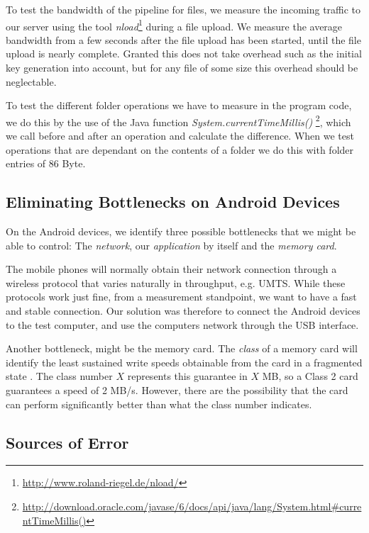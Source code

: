 \documentclass[pdftex,english,10pt,b5paper,twoside]{book}
\begin{document}
To test the bandwidth of the pipeline for files, we measure the incoming
traffic to our server using the tool \emph{nload}\footnote{
\url{http://www.roland-riegel.de/nload/}} during a file upload.  We measure the
average bandwidth from a few seconds after the file upload has been started,
until the file upload is nearly complete. Granted this does not take overhead
such as the initial key generation into account, but for any file of some size
this overhead should be neglectable.


To test the different folder operations we have to measure in the program code,
we do this by the use of the Java function
\emph{System.currentTimeMillis()}
\footnote{\url{http://download.oracle.com/javase/6/docs/api/java/lang/System.html\#currentTimeMillis()}},
which we call before and after an operation and calculate the difference. When
we test operations that are dependant on the contents of a folder we do this
with folder entries of 86 Byte.

\subsection{Eliminating Bottlenecks on Android Devices}

On the Android devices, we identify three possible bottlenecks that we might be
able to control: The \emph{network}, our \emph{application} by itself and the
\emph{memory card}.

The mobile phones will normally obtain their network connection through a
wireless protocol that varies naturally in throughput, e.g. \ac{UMTS}. While
these protocols work just fine, from a measurement standpoint, we want to have
a fast and stable connection. Our solution was therefore to connect the Android
devices to the test computer, and use the computers network through the
\ac{USB} interface.

Another bottleneck, might be the memory card. The \emph{class} of a memory card
will identify the least sustained write speeds obtainable from the card in a
fragmented state \cite{sdcard}. The class number $X$ represents this guarantee
in $X$ MB, so a Class 2 card guarantees a speed of 2 MB/s. However, there are
the possibility that the card can perform significantly better than what the
class number indicates.


\subsection{Sources of Error}
\end{document}
